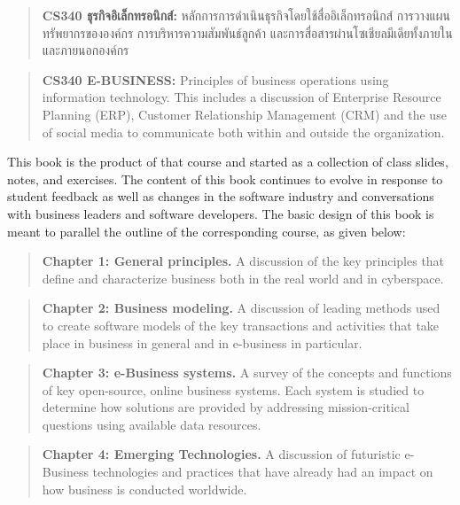 \documentclass[]{book}
\newcommand{\taibf}{\fontspec[Scale=1.3]{[THSarabunNew Bold.ttf:script=thai]}}
\newcommand{\tai}{\fontspec[Scale=1.3]{[THSarabunNew.ttf:script=thai]}}
\begin{document}
\begin{quote}
\textbf{CS340 \taibf ธุรกิจอิเล็กทรอนิกส์:} \tai หลักการการดำเนินธุรกิจโดยใช้สื่ออิเล็กทรอนิกส์ การวางแผนทรัพยากรขององค์กร การบริหารความสัมพันธ์ลูกค้า และการสื่อสารผ่านโซเชียลมีเดียทั้งภายในและภายนอกองค์กร
\end{quote}

\begin{quote}
\textbf{CS340 E-BUSINESS:} Principles of business operations using information technology. This includes a discussion of Enterprise Resource Planning (ERP), Customer Relationship Management (CRM) and the use of social media to communicate both within and outside the organization.
\end{quote}

This book is the product of that course and started as a collection of class slides, notes, and exercises. The content of this book continues to evolve in response to student feedback as well as changes in the software industry and conversations with business leaders and software developers. The basic design of this book is meant to parallel the outline of the corresponding course, as given below:

\begin{quote}
\textbf{Chapter 1: General principles.} A discussion of the key principles that define and characterize business both in the real world and in cyberspace.
\end{quote}

\begin{quote}
\textbf{Chapter 2: Business modeling.} A discussion of leading methods used to create software models of the key transactions and activities that take place in business in general and in e-business in particular.
\end{quote}

\begin{quote}
\textbf{Chapter 3: e-Business systems.} A survey of the concepts and functions of key open-source, online business systems. Each system is studied to determine how solutions are provided by addressing mission-critical questions using available data resources.
\end{quote}

\begin{quote}
\textbf{Chapter 4: Emerging Technologies.} A discussion of futuristic e-Business technologies and practices that have already had an impact on how business is conducted worldwide.
\end{quote}
\end{document}
